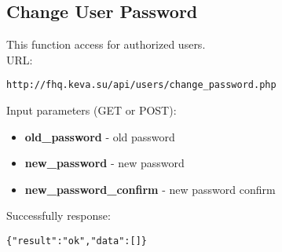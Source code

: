 \subsection{Change User Password}
\par

This function access for authorized users. \\

URL:
\begin{Verbatim}[frame=single]
http://fhq.keva.su/api/users/change_password.php
\end{Verbatim}

Input parameters (GET or POST):
\begin{itemize}
  \item \textbf{old\_password} - old password
  \item \textbf{new\_password} - new password
  \item \textbf{new\_password\_confirm} - new password confirm
\end{itemize}

Successfully response:  \\
\begin{Verbatim}[frame=single]
{"result":"ok","data":[]}
\end{Verbatim}

